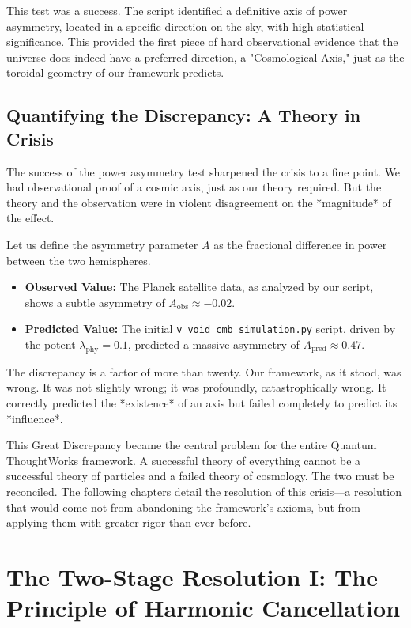 \documentclass[12pt]{report}
\begin{document}
This test was a success. The script identified a definitive axis of power asymmetry, located in a specific direction on the sky, with high statistical significance. This provided the first piece of hard observational evidence that the universe does indeed have a preferred direction, a "Cosmological Axis," just as the toroidal geometry of our framework predicts.

\section{Quantifying the Discrepancy: A Theory in Crisis}
The success of the power asymmetry test sharpened the crisis to a fine point. We had observational proof of a cosmic axis, just as our theory required. But the theory and the observation were in violent disagreement on the *magnitude* of the effect.

Let us define the asymmetry parameter $A$ as the fractional difference in power between the two hemispheres.
\begin{itemize}
    \item \textbf{Observed Value:} The Planck satellite data, as analyzed by our script, shows a subtle asymmetry of $A_{\text{obs}} \approx -0.02$.
    \item \textbf{Predicted Value:} The initial \texttt{v\_void\_cmb\_simulation.py} script, driven by the potent $\lambda_{\text{phy}} = 0.1$, predicted a massive asymmetry of $A_{\text{pred}} \approx 0.47$.
\end{itemize}

The discrepancy is a factor of more than twenty. Our framework, as it stood, was wrong. It was not slightly wrong; it was profoundly, catastrophically wrong. It correctly predicted the *existence* of an axis but failed completely to predict its *influence*.

This Great Discrepancy became the central problem for the entire Quantum ThoughtWorks framework. A successful theory of everything cannot be a successful theory of particles and a failed theory of cosmology. The two must be reconciled. The following chapters detail the resolution of this crisis—a resolution that would come not from abandoning the framework's axioms, but from applying them with greater rigor than ever before.

\chapter{The Two-Stage Resolution I: The Principle of Harmonic Cancellation}
\end{document}
